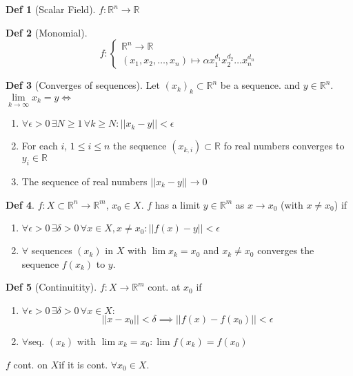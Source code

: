 \documentclass[a4paper, 10pt]{article}
\theoremstyle{definition}
\newtheorem*{definition}{Def}
\theoremstyle{colored}
\theoremstyle{ex}
\theoremstyle{named}
\newcommand{\R}{\mathbb{R}}
\begin{document}
\begin{definition}[Scalar Field]
    \(f: \R^n \to \R\)
\end{definition}

\begin{definition}[Monomial]
    \[f :\begin{cases}
        \R^n \to \R \\
        (x_1, x_2, \ldots, x_n) \mapsto \alpha x_1^{d_1} x_2^{d_2} \ldots x_n^{d_n}
    \end{cases}\]
\end{definition}

\begin{definition}[Converges of sequences]
    Let \((x_k)_k \subset \R^n\) be a sequence.
     and \(y \in \R^n\). \(\lim\limits_{k \to \infty}x_k = y \iff\)
    \begin{enumerate}
        \item \(\forall \epsilon > 0 \, \exists N \geq 1 \, \forall k \geq N: ||x_k - y|| < \epsilon\)
        \item For each \(i\), \(1 \leq i \leq n\) the sequence \((x_{k, i}) \subset \R\) fo real numbers converges to \(y_i \in \R\)
        \item The sequence of real numbers \(||x_k - y|| \to 0\)
    \end{enumerate}
        
\end{definition}

\begin{definition}
    \(f: X \subset \R^n \to \R^m\), \(x_0 \in X\).
    \(f\) has a limit \(y \in \R^m\) as \(x \to x_0\) (with \(x \neq x_0\)) if
    \begin{enumerate}
        \item \(\forall \epsilon > 0 \, \exists \delta > 0 \, \forall x \in X, x \neq x_0: ||f(x) - y|| < \epsilon\)
        \item \(\forall\) sequences \((x_k)\) in \(X\) with \(\lim x_k = x_0\) and \(x_k \neq x_0\) converges the sequence \(f(x_k)\) to \(y\).
    \end{enumerate}
\end{definition}

\begin{definition}[Continuitity]
    \(f: X \to \R^m\) cont. at \(x_0\) if
    \begin{enumerate}
        \item \(\forall \epsilon > 0 \, \exists \delta > 0 \, \forall x \in X : \)
        \[||x-x_0|| < \delta \implies ||f(x) - f(x_0)|| < \epsilon\]
        \item \(\forall\)seq. \((x_k)\) with \(\lim x_k = x_0: \lim f(x_k) = f(x_0)\)
    \end{enumerate}
    \(f\) cont. on \(X\)if it is cont. \(\forall x_0 \in X\).
\end{definition}
\end{document}
